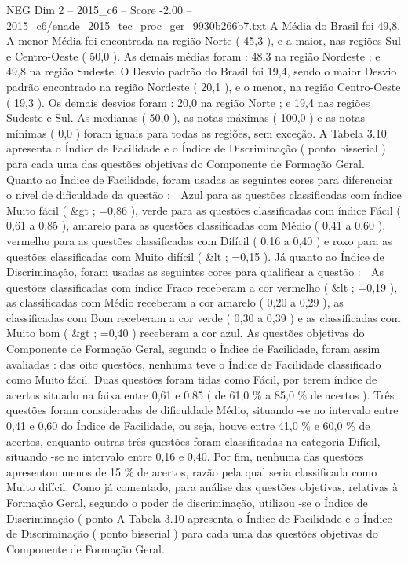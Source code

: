 \begin{textsample}{NEG Dim 2 – 2015\_c6 – Score -2.00 – 2015\_c6/enade\_2015\_tec\_proc\_ger\_9930b266b7.txt}
A Média do Brasil foi 49,8.
A menor Média foi encontrada na região Norte ( 45,3 ), e a maior, nas regiões Sul e Centro-Oeste ( 50,0 ).
As demais médias foram : 48,3 na região Nordeste ; e 49,8 na região Sudeste.
O Desvio padrão do Brasil foi 19,4, sendo o maior Desvio padrão encontrado na região Nordeste ( 20,1 ), e o menor, na região Centro-Oeste ( 19,3 ).
Os demais desvios foram : 20,0 na região Norte ; e 19,4 nas regiões Sudeste e Sul.
As medianas ( 50,0 ), as notas máximas ( 100,0 ) e as notas mínimas ( 0,0 ) foram iguais para todas as regiões, sem exceção.
A Tabela 3.10 apresenta o Índice de Facilidade e o Índice de Discriminação ( ponto bisserial ) para cada uma das questões objetivas do Componente de Formação Geral.
Quanto ao Índice de Facilidade, foram usadas as seguintes cores para diferenciar o nível de dificuldade da questão :  Azul para as questões classificadas com índice Muito fácil ( \&gt ; =0,86 ), verde para as questões classificadas com índice Fácil ( 0,61 a 0,85 ), amarelo para as questões classificadas com Médio ( 0,41 a 0,60 ), vermelho para as questões classificadas com Difícil ( 0,16 a 0,40 ) e roxo para as questões classificadas com Muito difícil ( \&lt ; =0,15 ).
Já quanto ao Índice de Discriminação, foram usadas as seguintes cores para qualificar a questão :  As questões classificadas com índice Fraco receberam a cor vermelho ( \&lt ; =0,19 ), as classificadas com Médio receberam a cor amarelo ( 0,20 a 0,29 ), as classificadas com Bom receberam a cor verde ( 0,30 a 0,39 ) e as classificadas com Muito bom ( \&gt ; =0,40 ) receberam a cor azul.
As questões objetivas do Componente de Formação Geral, segundo o Índice de Facilidade, foram assim avaliadas : das oito questões, nenhuma teve o Índice de Facilidade classificado como Muito fácil.
Duas questões foram tidas como Fácil, por terem índice de acertos situado na faixa entre 0,61 e 0,85 ( de 61,0 \% a 85,0 \% de acertos ).
Três questões foram consideradas de dificuldade Médio, situando -se no intervalo entre 0,41 e 0,60 do Índice de Facilidade, ou seja, houve entre 41,0 \% e 60,0 \% de acertos, enquanto outras três questões foram classificadas na categoria Difícil, situando -se no intervalo entre 0,16 e 0,40.
Por fim, nenhuma das questões apresentou menos de 15 \% de acertos, razão pela qual seria classificada como Muito difícil.
Como já comentado, para análise das questões objetivas, relativas à Formação Geral, segundo o poder de discriminação, utilizou -se o Índice de Discriminação ( ponto A Tabela 3.10 apresenta o Índice de Facilidade e o Índice de Discriminação ( ponto bisserial ) para cada uma das questões objetivas do Componente de Formação Geral.

\end{textsample}
